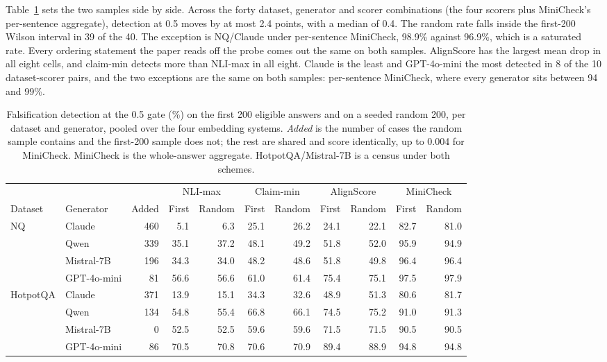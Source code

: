 \documentclass[11pt]{article}
\begin{document}
Table~\ref{tab:prefixrand} sets the two samples side by side. Across the forty dataset, generator and scorer combinations (the four scorers plus MiniCheck's per-sentence aggregate), detection at 0.5 moves by at most 2.4 points, with a median of 0.4. The random rate falls inside the first-200 Wilson interval in 39 of the 40. The exception is NQ/Claude under per-sentence MiniCheck, 98.9\% against 96.9\%, which is a saturated rate. Every ordering statement the paper reads off the probe comes out the same on both samples. AlignScore has the largest mean drop in all eight cells, and claim-min detects more than NLI-max in all eight. Claude is the least and GPT-4o-mini the most detected in 8 of the 10 dataset-scorer pairs, and the two exceptions are the same on both samples: per-sentence MiniCheck, where every generator sits between 94 and 99\%.

\begin{table}[t]
\centering
\footnotesize
\setlength{\tabcolsep}{4.5pt}
\begin{tabular}{llrrrrrrrrr}
\toprule
 & & & \multicolumn{2}{c}{NLI-max} & \multicolumn{2}{c}{Claim-min} & \multicolumn{2}{c}{AlignScore} & \multicolumn{2}{c}{MiniCheck} \\
\cmidrule(lr){4-5}\cmidrule(lr){6-7}\cmidrule(lr){8-9}\cmidrule(lr){10-11}
Dataset & Generator & Added & First & Random & First & Random & First & Random & First & Random \\
\midrule
NQ & Claude & 460 & 5.1 & 6.3 & 25.1 & 26.2 & 24.1 & 22.1 & 82.7 & 81.0 \\
 & Qwen & 339 & 35.1 & 37.2 & 48.1 & 49.2 & 51.8 & 52.0 & 95.9 & 94.9 \\
 & Mistral-7B & 196 & 34.3 & 34.0 & 48.2 & 48.6 & 51.8 & 49.8 & 96.4 & 96.4 \\
 & GPT-4o-mini & 81 & 56.6 & 56.6 & 61.0 & 61.4 & 75.4 & 75.1 & 97.5 & 97.9 \\
\midrule
HotpotQA & Claude & 371 & 13.9 & 15.1 & 34.3 & 32.6 & 48.9 & 51.3 & 80.6 & 81.7 \\
 & Qwen & 134 & 54.8 & 55.4 & 66.8 & 66.1 & 74.5 & 75.2 & 91.0 & 91.3 \\
 & Mistral-7B & 0 & 52.5 & 52.5 & 59.6 & 59.6 & 71.5 & 71.5 & 90.5 & 90.5 \\
 & GPT-4o-mini & 86 & 70.5 & 70.8 & 70.6 & 70.9 & 89.4 & 88.9 & 94.8 & 94.8 \\
\bottomrule
\end{tabular}
\caption{Falsification detection at the 0.5 gate (\%) on the first 200 eligible answers and on a seeded random 200, per dataset and generator, pooled over the four embedding systems. \emph{Added} is the number of cases the random sample contains and the first-200 sample does not; the rest are shared and score identically, up to 0.004 for MiniCheck. MiniCheck is the whole-answer aggregate. HotpotQA/Mistral-7B is a census under both schemes.}
\label{tab:prefixrand}
\end{table}
\end{document}
